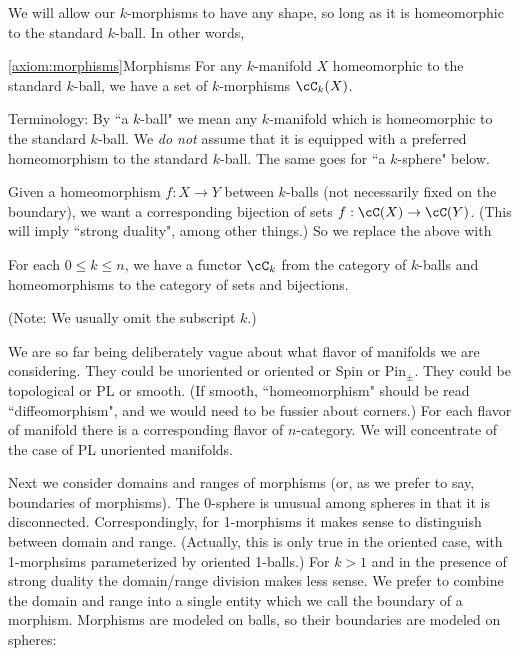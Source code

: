 We will allow our $k$-morphisms to have any shape, so long as it is homeomorphic to 
the standard $k$-ball.
In other words,

\begin{preliminary-axiom}{\ref{axiom:morphisms}}{Morphisms}
For any $k$-manifold $X$ homeomorphic 
to the standard $k$-ball, we have a set of $k$-morphisms
$\cC_k(X)$.
\end{preliminary-axiom}

Terminology: By ``a $k$-ball" we mean any $k$-manifold which is homeomorphic to the 
standard $k$-ball.
We {\it do not} assume that it is equipped with a 
preferred homeomorphism to the standard $k$-ball.
The same goes for ``a $k$-sphere" below.


Given a homeomorphism $f:X\to Y$ between $k$-balls (not necessarily fixed on 
the boundary), we want a corresponding
bijection of sets $f:\cC(X)\to \cC(Y)$.
(This will imply ``strong duality", among other things.)
So we replace the above with

\begin{axiom}[Morphisms]
\label{axiom:morphisms}
For each $0 \le k \le n$, we have a functor $\cC_k$ from 
the category of $k$-balls and 
homeomorphisms to the category of sets and bijections.
\end{axiom}


(Note: We usually omit the subscript $k$.)

We are so far  being deliberately vague about what flavor of manifolds we are considering.
They could be unoriented or oriented or Spin or $\mbox{Pin}_\pm$.
They could be topological or PL or smooth.
(If smooth, ``homeomorphism" should be read ``diffeomorphism", and we would need
to be fussier about corners.)
For each flavor of manifold there is a corresponding flavor of $n$-category.
We will concentrate of the case of PL unoriented manifolds.

Next we consider domains and ranges of morphisms (or, as we prefer to say, boundaries
of morphisms).
The 0-sphere is unusual among spheres in that it is disconnected.
Correspondingly, for 1-morphisms it makes sense to distinguish between domain and range.
(Actually, this is only true in the oriented case, with 1-morphsims parameterized
by oriented 1-balls.)
For $k>1$ and in the presence of strong duality the domain/range division makes less sense.
We prefer to combine the domain and range into a single entity which we call the 
boundary of a morphism.
Morphisms are modeled on balls, so their boundaries are modeled on spheres:


